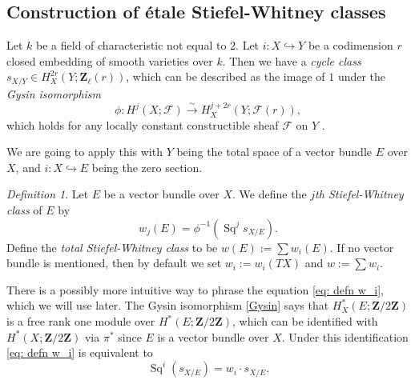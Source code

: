 \documentclass[10pt, reqno]{amsart}
\numberwithin{equation}{subsection}
\newcommand{\Z}{\mathbf{Z}}
\newcommand{\Cal}[1]{\mathcal{#1}}
\newcommand{\co}{\colon}
\DeclareMathOperator{\et}{\acute{e}t}
\DeclareMathOperator{\Sq}{Sq}
\theoremstyle{remark}
\newtheorem{defn}[thm]{Definition}
\begin{document}
\subsection{Construction of \'{e}tale Stiefel-Whitney classes}\label{subsec: SW construction}


Let $k$ be a field of characteristic not equal to $2$. Let $i \colon X \hookrightarrow Y$ be a codimension $r$ closed embedding of smooth varieties over $k$. Then we have a \emph{cycle class} $s_{X/Y} \in H^{2r}_X(Y; \Z_{\ell}(r))$, which can be described as the image of $1$ under the \emph{Gysin isomorphism}   
\begin{equation}\label{Gysin}
\phi \colon H^j(X; \Cal{F}) \xrightarrow{\sim}  H^{j+2r}_X(Y; \Cal{F}(r)),
\end{equation}
which holds for any locally constant constructible sheaf $\Cal{F}$ on $Y$ \cite[\S I.10]{FK88}.

We are going to apply this with $Y$ being the total space of a vector bundle $E$ over $X$, and $i \co X \hookrightarrow E$ being the zero section. 

\begin{defn}
Let $ E $ be a vector bundle over $X$. We define the \emph{$j$th Stiefel-Whitney class} of $E$ by 
\begin{equation}\label{eq: defn w_i}
w_j(E) = \phi^{-1}(\Sq^j s_{X/E} ).
\end{equation}
Define the \emph{total Stiefel-Whitney class} to be $w(E) := \sum w_i(E)$. If no vector bundle is mentioned, then by default we set $w_i := w_i(TX)$ and $w := \sum w_i$. 
\end{defn}

There is a possibly more intuitive way to phrase the equation \eqref{eq: defn w_i}, which we will use later. The Gysin isomorphism \eqref{Gysin} says that $H_X^{*} (E; \Z/2\Z)$ is a free rank one module over $H^*_{\et}(E; \Z/2\Z)$, which can be identified with $H^*_{\et}(X; \Z/2\Z)$ via $\pi^*$ since $E$ is a vector bundle over $X$. Under this identification \eqref{eq: defn w_i} is equivalent to 
\begin{equation}\label{eq: second defn w_i}
\Sq^i (s_{X/E}) = w_i \cdot s_{X/E}. 
\end{equation}
\end{document}
